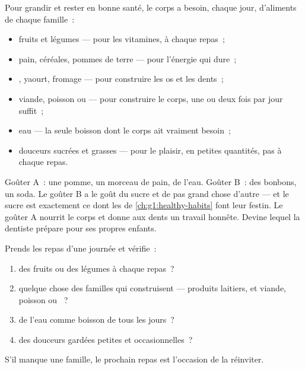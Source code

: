 \begin{proposition}\label{prop:g2:teeth-and-eating-well:balanced}
Pour grandir et rester en bonne santé, le corps a besoin, chaque
jour, d'aliments de chaque famille~:
\begin{itemize}
  \item fruits et légumes --- pour les vitamines, à chaque repas~;
  \item pain, céréales, pommes de terre --- pour l'énergie qui
        dure~;
  \item {}, yaourt, fromage --- pour construire les os et les
        dents~;
  \item viande, poisson ou  --- pour construire le corps, une
        ou deux fois par jour suffit~;
  \item eau --- la seule boisson dont le corps ait vraiment
        besoin~;
  \item douceurs sucrées et grasses --- pour le plaisir, en petites
        quantités, pas à chaque repas.
\end{itemize}
\end{proposition}
\admitted

\begin{example}\label{ex:g2:teeth-and-eating-well:snack}
Goûter A~: une pomme, un morceau de pain, de l'eau. Goûter B~: des
bonbons, un soda. Le goûter B a le goût du sucre et de pas grand
chose d'autre --- et le sucre est exactement ce dont les  de
\cref{ch:g1:healthy-habits} font leur festin. Le goûter A nourrit le
corps et donne aux dents un travail honnête. Devine lequel la
dentiste prépare pour ses propres enfants.
\end{example}

\begin{method}\label{met:g2:teeth-and-eating-well:check}
Prends les repas d'une journée et vérifie~:
\begin{enumerate}
  \item des fruits ou des légumes à chaque repas~?
  \item quelque chose des familles qui construisent --- produits
        laitiers, et viande, poisson ou ~?
  \item de l'eau comme boisson de tous les jours~?
  \item des douceurs gardées petites et occasionnelles~?
\end{enumerate}
S'il manque une famille, le prochain repas est l'occasion de la
réinviter.
\end{method}

